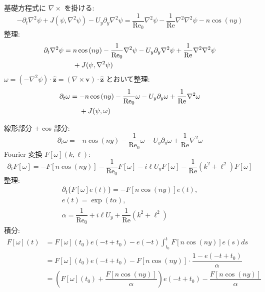 \documentclass[12pt, a4j]{jsarticle}
\newcommand{\p}{\partial}
\renewcommand{\Re}{\mathrm{Re}}
\begin{document}
基礎方程式に $\nabla \times$ を掛ける:
\begin{equation}
    - \p_{t} \nabla^{2} \psi
    + J(\psi, \nabla^{2} \psi)
    - U_{y} \p_{y} \nabla^{2} \psi
    = \dfrac{1}{\Re_{0}} \nabla^{2} \psi
      - \dfrac{1}{\Re} \nabla^{2} \nabla^{2} \psi
      - n \cos{(n y)}
\end{equation}
整理:
\begin{align}
    \p_{t} \nabla^{2} \psi
    &= n \cos{(n y)}
       - \dfrac{1}{\Re_{0}} \nabla^{2} \psi
       - U_{y} \p_{y} \nabla^{2} \psi
       + \dfrac{1}{\Re} \nabla^{2} \nabla^{2} \psi \\
    &\hphantom{{}={}}
       + J(\psi, \nabla^{2} \psi)
\end{align}
$\omega
 = ( - \nabla^{2} \psi ) \cdot \hat{\bm{z}}
 = ( \nabla \times \bm{v} ) \cdot \hat{\bm{z}}$
とおいて整理:
\begin{align}
    \p_{t} \omega
    &= - n \cos{(n y)}
       - \dfrac{1}{\Re_{0}} \omega
       - U_{y} \p_{y} \omega
       + \dfrac{1}{\Re} \nabla^{2} \omega \\
    &\hphantom{{}={}}
       + J(\psi, \omega)
\end{align}


線形部分 $+$ cos 部分:
\begin{equation}
    \p_{t} \omega
    = - n \cos{(n y)}
      - \dfrac{1}{\Re_{0}} \omega
      - U_{y} \p_{y} \omega
      + \dfrac{1}{\Re} \nabla^{2} \omega
\end{equation}
Fourier 変換 $F[\omega](k, \ell)$:
\begin{equation}
    \p_{t} F[\omega]
    = - F[n \cos{(n y)}]
      - \dfrac{1}{\Re_{0}} F[\omega]
      - i \ell U_{y} F[\omega]
      - \dfrac{1}{\Re} (k^{2} + \ell^{2}) F[\omega]
\end{equation}
整理:
\begin{gather}
    \p_{t} \{ F[\omega] e(t) \} 
    = - F[n \cos{(n y)}] e(t),
    \\
    e(t) = \exp{(t \alpha)},
    \\
    \alpha
    = \dfrac{1}{\Re_{0}}
      + i \ell U_{y}
      + \dfrac{1}{\Re} (k^{2} + \ell^{2})
\end{gather}
積分:
\begin{align}
    F[\omega](t)
    &= F[\omega](t_{0}) e(- t + t_{0})
       - e(- t) \int_{t_{0}}^{t} F[n \cos{(n y)}] e(s) d s
    \\
    &= F[\omega](t_{0}) e(- t + t_{0})
       - F[n \cos{(n y)}]
         \cdot \dfrac{1 - e(- t + t_{0})}{\alpha}
    \\
    &= \left(
           F[\omega](t_{0})
           + \dfrac{F[ n \cos{(n y)} ]}{\alpha}
       \right) e(- t + t_{0})
       - \dfrac{F[ n \cos{(n y)} ]}{\alpha}
\end{align}
\end{document}
